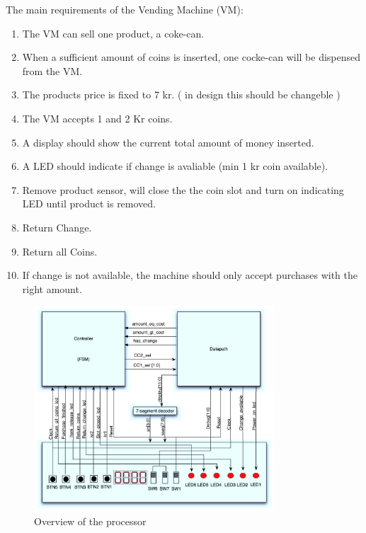 The main requirements of the Vending Machine (VM):

\begin{enumerate}
\item The VM can sell one product, a coke-can.
\item When a sufficient amount of coins is inserted, one cocke-can will be dispensed from the VM.
\item The products price is fixed to 7 kr. ( in design this should be changeble )
\item The VM accepts 1 and 2 Kr coins.
\item A display should show the current total amount of money inserted.
\item A LED should indicate if change is avaliable (min 1 kr coin available).
\item Remove product sensor, will close the the coin slot and turn on indicating LED until product is removed.
\item Return Change.
\item Return all Coins.
\item If change is not available, the machine should only accept purchases with the right amount.
\end{enumerate}

\begin{figure}
\centering
\includegraphics[width=0.8\textwidth]{fig/SystemDescription.pdf}
\caption{Overview of the processor}
\label{fig:system_description}
\end{figure}